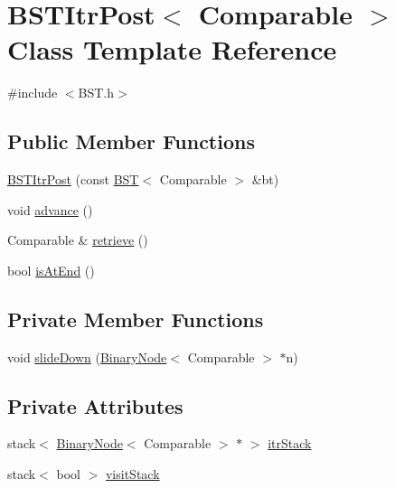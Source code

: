 \hypertarget{class_b_s_t_itr_post}{}\section{B\+S\+T\+Itr\+Post$<$ Comparable $>$ Class Template Reference}
\label{class_b_s_t_itr_post}


{\ttfamily \#include $<$B\+S\+T.\+h$>$}

\subsection*{Public Member Functions}
\begin{DoxyCompactItemize}
\item 
\hyperlink{class_b_s_t_itr_post_acf7e537dea01978f40c40909c55c56c2}{B\+S\+T\+Itr\+Post} (const \hyperlink{class_b_s_t}{B\+S\+T}$<$ Comparable $>$ \&bt)
\item 
void \hyperlink{class_b_s_t_itr_post_a376098e5a82cd02118dd4dcdec49bb26}{advance} ()
\item 
Comparable \& \hyperlink{class_b_s_t_itr_post_a72446e4d0df0bcafc14294a78faeb56e}{retrieve} ()
\item 
bool \hyperlink{class_b_s_t_itr_post_a2f330e73bb817e8bd1c797805e66ddb7}{is\+At\+End} ()
\end{DoxyCompactItemize}
\subsection*{Private Member Functions}
\begin{DoxyCompactItemize}
\item 
void \hyperlink{class_b_s_t_itr_post_a56a13ae3a0358eeb06a83d4de745344a}{slide\+Down} (\hyperlink{class_binary_node}{Binary\+Node}$<$ Comparable $>$ $\ast$n)
\end{DoxyCompactItemize}
\subsection*{Private Attributes}
\begin{DoxyCompactItemize}
\item 
stack$<$ \hyperlink{class_binary_node}{Binary\+Node}$<$ Comparable $>$ $\ast$ $>$ \hyperlink{class_b_s_t_itr_post_add32204909b8a6c3635b926832192ced}{itr\+Stack}
\item 
stack$<$ bool $>$ \hyperlink{class_b_s_t_itr_post_a5a9af907c7b135acdf3b5ed9affbb9a7}{visit\+Stack}
\end{DoxyCompactItemize}


